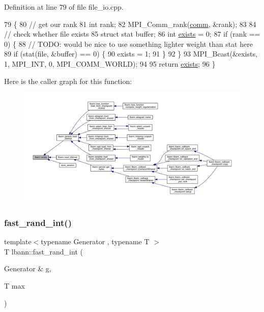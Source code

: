 Definition at line 79 of file file\+\_\+io.\+cpp.


\begin{DoxyCode}
79                                   \{
80   \textcolor{comment}{// get our rank}
81   \textcolor{keywordtype}{int} rank;
82   MPI\_Comm\_rank(\hyperlink{file__io_8cpp_ab048c6f9fcbcfaa57ce68b00263dbebe}{comm}, &rank);
83 
84   \textcolor{comment}{// check whether file exists}
85   \textcolor{keyword}{struct }stat buffer;
86   \textcolor{keywordtype}{int} \hyperlink{namespacelbann_aefae2a9fc9d742ece0fa8ca7ed9ee137}{exists} = 0;
87   \textcolor{keywordflow}{if} (rank == 0) \{
88     \textcolor{comment}{// TODO: would be nice to use something lighter weight than stat here}
89     \textcolor{keywordflow}{if} (stat(file, &buffer) == 0) \{
90       exists = 1;
91     \}
92   \}
93   MPI\_Bcast(&exists, 1, MPI\_INT, 0, MPI\_COMM\_WORLD);
94 
95   \textcolor{keywordflow}{return} \hyperlink{namespacelbann_aefae2a9fc9d742ece0fa8ca7ed9ee137}{exists};
96 \}
\end{DoxyCode}
Here is the caller graph for this function\+:\nopagebreak
\begin{figure}[H]
\begin{center}
\leavevmode
\includegraphics[width=350pt]{namespacelbann_aefae2a9fc9d742ece0fa8ca7ed9ee137_icgraph}
\end{center}
\end{figure}
\mbox{\label{namespacelbann_a557aaed6267e7aaf583a75149e9c670c}} 
\subsubsection{\texorpdfstring{fast\+\_\+rand\+\_\+int()}{fast\_rand\_int()}}
{\footnotesize\ttfamily template$<$typename Generator , typename T $>$ \\
T lbann\+::fast\+\_\+rand\+\_\+int (\begin{DoxyParamCaption}\item[{Generator \&}]{g,  }\item[{T}]{max }\end{DoxyParamCaption})\hspace{0.3cm}{\ttfamily [inline]}}


